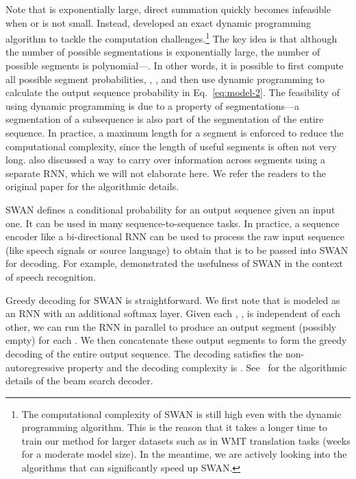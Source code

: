\documentclass{article}
\begin{document}
Note that  is exponentially large, direct summation quickly becomes
infeasible when  or  is not small. Instead, \citet{wang2017sequence}
developed an exact
dynamic programming algorithm to tackle the computation challenges.\footnote{The
computational complexity of SWAN is still high even with the dynamic programming
algorithm.  This is the reason that it takes a longer time to train our
method for larger datasets such as in WMT translation tasks (weeks for a
moderate model size).  In the meantime, we are actively looking into the
algorithms that can significantly speed up SWAN.} The key idea is that although
the number of possible segmentations is exponentially large, the number of
possible segments is polynomial---. In other words, it is possible to
first compute all possible segment probabilities, , , and then use dynamic programming to calculate the output sequence
probability  in Eq.~\eqref{eq:model-2}. The feasibility of
using dynamic programming is due to a property of segmentations---a segmentation
of a subsequence is also part of the segmentation of the entire sequence. In
practice, a maximum length  for a segment  is enforced to reduce the
computational complexity, since the length of useful segments is often not very
long. 
\cite{wang2017sequence} also discussed a way to carry over information
across segments using a separate RNN, which we will not elaborate here. 
We refer the readers to the original paper for the algorithmic details.

SWAN defines a conditional probability for an output sequence given an input
one. It can be used in many sequence-to-sequence tasks. In practice, a sequence
encoder like a bi-directional RNN can be used to process the raw input sequence
(like speech signals or source language) to obtain  that is to be
passed into SWAN for decoding. For example, \cite{wang2017sequence} demonstrated
the usefulness of SWAN in the context of speech recognition.

Greedy decoding for SWAN is straightforward. We first note that  is
modeled as an RNN with an additional softmax layer. 
Given each , , is independent of each other, we can run the RNN in parallel to produce an output segment (possibly empty) for each . 
We then concatenate these output segments to form the greedy
decoding of the entire output sequence.  
The decoding satisfies the non-autoregressive property \citep{gu2018non-autoregressive} and the decoding complexity is .
See~\cite{wang2017sequence} for the
algorithmic details of the beam search decoder.
\end{document}

